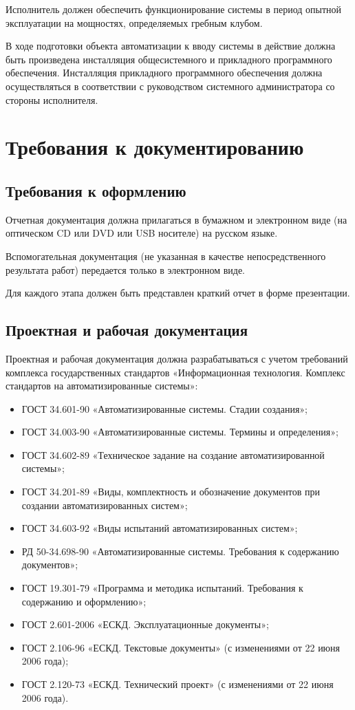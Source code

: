 \documentclass[14pt]{extreport}
\begin{document}
Исполнитель должен обеспечить функционирование системы в период
опытной эксплуатации на мощностях, определяемых гребным клубом.

В ходе подготовки объекта автоматизации к вводу системы в действие
должна быть произведена инсталляция общесистемного и прикладного программного
обеспечения. Инсталляция прикладного программного обеспечения должна
осуществляться в соответствии с руководством системного администратора со стороны исполнителя.

\section{Требования к документированию}

\subsection{Требования к оформлению}

Отчетная документация должна прилагаться в бумажном и электронном
виде (на оптическом CD или DVD или USB носителе) на русском языке.

Вспомогательная документация (не указанная в качестве непосредственного
результата работ) передается только в электронном виде.

Для каждого этапа должен быть представлен краткий отчет в форме
презентации.

\subsection{Проектная и рабочая документация}

Проектная и рабочая документация должна разрабатываться с учетом
требований комплекса государственных стандартов «Информационная
технология. Комплекс стандартов на автоматизированные системы»:
\begin{itemize}
\item ГОСТ 34.601-90 «Автоматизированные системы. Стадии создания»;
\item ГОСТ 34.003-90 «Автоматизированные системы. Термины и
определения»;
\item ГОСТ 34.602-89 «Техническое задание на создание
автоматизированной системы»;
\item ГОСТ 34.201-89 «Виды, комплектность и обозначение документов при
создании автоматизированных систем»;
\item ГОСТ 34.603-92 «Виды испытаний автоматизированных систем»;
\item РД 50-34.698-90 «Автоматизированные системы. Требования к
содержанию документов»;
\item ГОСТ 19.301-79 «Программа и методика испытаний. Требования к
содержанию и оформлению»;
\item ГОСТ 2.601-2006 «ЕСКД. Эксплуатационные документы»;
\item ГОСТ 2.106-96 «ЕСКД. Текстовые документы» (с изменениями от 22
июня 2006 года);
\item ГОСТ 2.120-73 «ЕСКД. Технический проект» (с изменениями от 22
июня 2006 года).
\end{itemize}
\end{document}
